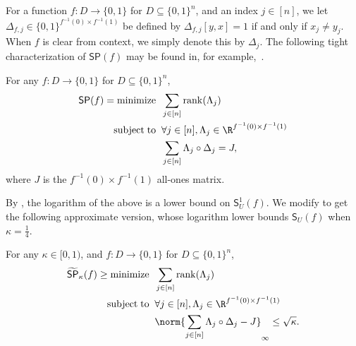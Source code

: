 \documentclass{toc}
\begin{document}
For a function $f:D\rightarrow\{0,1\}$ for $D\subseteq\{0,1\}^n$, and an index $j\in[n]$, we let $\Delta_{f,j}\in\{0,1\}^{f^{-1}(0)\times f^{-1}(1)}$ be defined by $\Delta_{f,j}[y,x]=1$ if and only if $x_j\neq y_j$. 
When $f$ is clear from context, we simply denote this by $\Delta_j$. The following tight characterization of $\mathsf{SP}(f)$ may be found in, for example,~\cite{Lok09}.  
\begin{lemma}\label{lem:SP-opt}
For any $f:D\rightarrow \{0,1\}$ for $D\subseteq\{0,1\}^n$, 
\begin{align*}
\mathsf{SP}(f)=\mathrm{minimize}{}\;\;& \sum_{j\in [n]}\mathrm{rank}(\Lambda_j) \\
\mathrm{subject}\;\mathrm{to}{}\;\; & \forall j\in [n],\Lambda_j\in \R^{f^{-1}(0)\times f^{-1}(1)}\\
& \sum_{j\in [n]}\Lambda_j\circ\Delta_j=J,
\end{align*}
where $J$ is the $f^{-1}(0)\times f^{-1}(1)$ all-ones matrix.
\end{lemma}
By , the logarithm of the above is a lower bound on $\mathsf{S}_U^1(f)$. 
We modify  to get the following approximate version, whose logarithm lower bounds $\mathsf{S}_U(f)$ when $\kappa=\frac{1}{4}$.
\begin{lemma}\label{lem:SP-opt-approx}
For any $\kappa\in [0,1)$, and $f:D\rightarrow \{0,1\}$ for $D\subseteq\{0,1\}^n$, 
\begin{align}
\widetilde{\mathsf{SP}}_\kappa(f) \geq \mathrm{minimize}{}\;\;&\sum_{j\in [n]}\mathrm{rank}(\Lambda_j)\label{eq:SP-opt}\\
\mathrm{subject}\;\mathrm{to}{}\;\;& \forall j\in [n], \Lambda_j\in \R^{f^{-1}(0)\times f^{-1}(1)}\nonumber\\
& \norm{\sum_{j\in [n]}\Lambda_j\circ\Delta_j-J}_\infty\leq\sqrt\kappa. \nonumber
\end{align}
\end{lemma}
\end{document}
